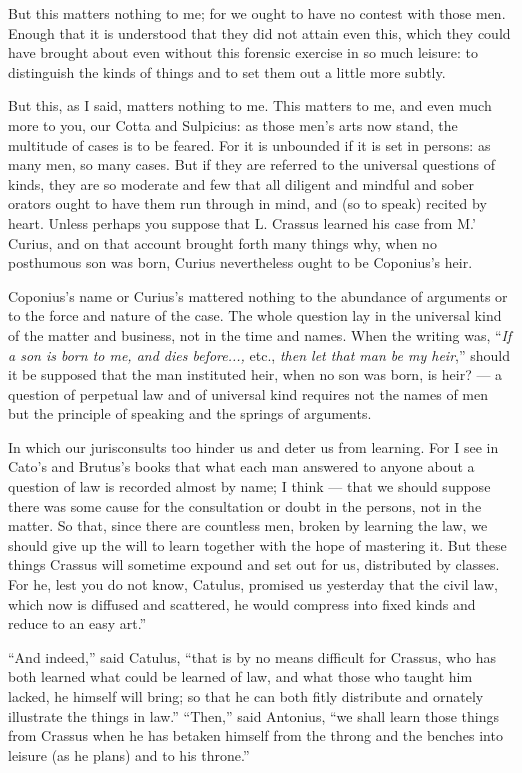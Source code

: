  But this matters nothing to me; for we ought to have no contest with those men. Enough that it is understood that they did not attain even this, which they could have brought about even without this forensic exercise in so much leisure: to distinguish the kinds of things and to set them out a little more subtly.

 But this, as I said, matters nothing to me. This matters to me, and even much more to you, our Cotta and Sulpicius: as those men's arts now stand, the multitude of cases is to be feared. For it is unbounded if it is set in persons: as many men, so many cases. But if they are referred to the universal questions of kinds, they are so moderate and few that all diligent and mindful and sober orators ought to have them run through in mind, and (so to speak) recited by heart. Unless perhaps you suppose that L. Crassus learned his case from M.' Curius, and on that account brought forth many things why, when no posthumous son was born, Curius nevertheless ought to be Coponius's heir.

 Coponius's name or Curius's mattered nothing to the abundance of arguments or to the force and nature of the case. The whole question lay in the universal kind of the matter and business, not in the time and names. When the writing was, ``\textit{If a son is born to me, and dies before...,} etc., \textit{then let that man be my heir},'' should it be supposed that the man instituted heir, when no son was born, is heir? — a question of perpetual law and of universal kind requires not the names of men but the principle of speaking and the springs of arguments.

 In which our jurisconsults too hinder us and deter us from learning. For I see in Cato's and Brutus's books that what each man answered to anyone about a question of law is recorded almost by name; I think — that we should suppose there was some cause for the consultation or doubt in the persons, not in the matter. So that, since there are countless men, broken by learning the law, we should give up the will to learn together with the hope of mastering it. But these things Crassus will sometime expound and set out for us, distributed by classes. For he, lest you do not know, Catulus, promised us yesterday that the civil law, which now is diffused and scattered, he would compress into fixed kinds and reduce to an easy art.''

 ``And indeed,'' said Catulus, ``that is by no means difficult for Crassus, who has both learned what could be learned of law, and what those who taught him lacked, he himself will bring; so that he can both fitly distribute and ornately illustrate the things in law.'' ``Then,'' said Antonius, ``we shall learn those things from Crassus when he has betaken himself from the throng and the benches into leisure (as he plans) and to his throne.''

